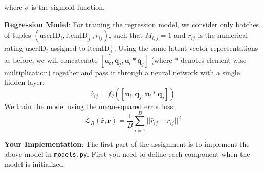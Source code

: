 \documentclass[12pt]{article}
\begin{document}
\noindent where $\sigma$ is the sigmoid function.

\vspace{0.2cm}

\noindent\textbf{Regression Model}: For training the regression model, we consider only batches of tuples $(\text{userID}_i, \text{itemID}_j^+, r_{ij})$, such that $M_{i, j} = 1$ and $r_{ij}$ is the numerical rating $\text{userID}_i$ assigned to $\text{itemID}_j^+$. Using the same latent vector representations as before, we will concatenate $[\mathbf{u}_i, \mathbf{q}_j, \mathbf{u}_i * \mathbf{q}_j]$ (where $*$ denotes element-wise multiplication) together and pass it through a neural network with a single hidden layer:
\begin{equation}
    \hat{r}_{ij}=f_{\theta}([\mathbf{u}_i, \mathbf{q}_j, \mathbf{u}_i * \mathbf{q}_j])
    \label{eq:reg}
\end{equation}
We train the model using the mean-squared error loss:
    \begin{equation}
       \mathcal{L}_R(\mathbf{\hat{r}}, \mathbf{r})= \frac{1}{B}\sum_{i=1}^B ||\hat{r}_{ij}-r_{ij}||^2
     \label{eq:r}
    \end{equation}

\vspace{0.2cm}

\noindent \noindent\textbf{Your Implementation}: The first part of the assignment is to implement the above model in \texttt{models.py}. First you need to define each component when the model is initialized. 
\end{document}

